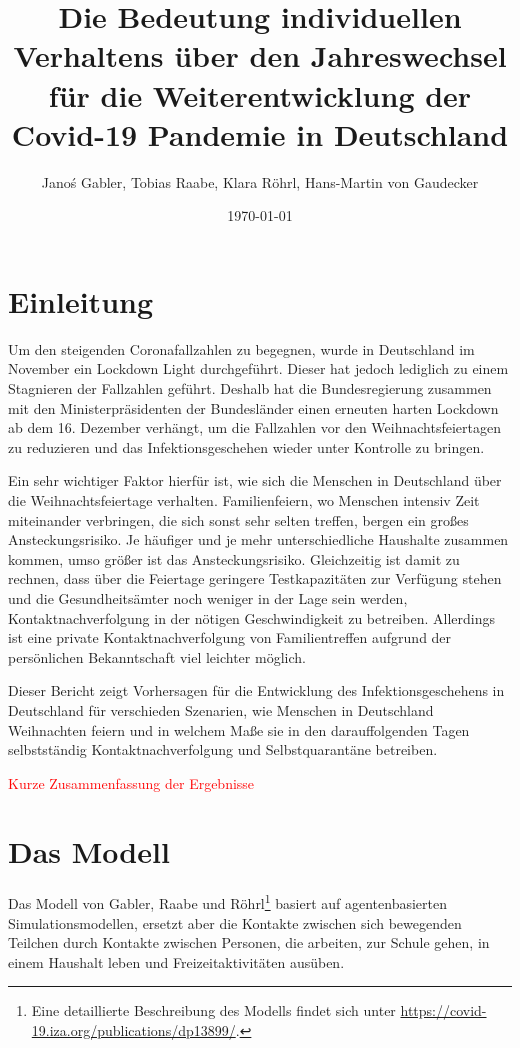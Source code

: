 \documentclass[a4paper,11pt,leqno,fleqn]{article}
\title{Die Bedeutung individuellen Verhaltens über den Jahreswechsel für die Weiterentwicklung der Covid-19 Pandemie in Deutschland}
\date{\today}
\author{Janoś Gabler, Tobias Raabe, Klara Röhrl, Hans-Martin von Gaudecker}
\begin{document}
\maketitle
{}
\setcounter{page}{1}


\section{Einleitung}

Um den steigenden Coronafallzahlen zu begegnen, wurde in Deutschland im November ein Lockdown Light durchgeführt.
Dieser hat jedoch lediglich zu einem Stagnieren der Fallzahlen geführt.
Deshalb hat die Bundesregierung zusammen mit den Ministerpräsidenten der Bundesländer einen erneuten harten Lockdown ab dem 16. Dezember verhängt, um die Fallzahlen vor den Weihnachtsfeiertagen zu reduzieren und das Infektionsgeschehen wieder unter Kontrolle zu bringen.

Ein sehr wichtiger Faktor hierfür ist, wie sich die Menschen in Deutschland über die Weihnachtsfeiertage verhalten.
Familienfeiern, wo Menschen intensiv Zeit miteinander verbringen, die sich sonst sehr selten treffen, bergen ein großes Ansteckungsrisiko.
Je häufiger und je mehr unterschiedliche Haushalte zusammen kommen, umso größer ist das Ansteckungsrisiko.
Gleichzeitig ist damit zu rechnen, dass über die Feiertage geringere Testkapazitäten zur Verfügung stehen und die Gesundheitsämter noch weniger in der Lage sein werden, Kontaktnachverfolgung in der nötigen Geschwindigkeit zu betreiben.
Allerdings ist eine private Kontaktnachverfolgung von Familientreffen aufgrund der persönlichen Bekanntschaft viel leichter möglich.

Dieser Bericht zeigt Vorhersagen für die Entwicklung des Infektionsgeschehens in Deutschland für verschieden Szenarien, wie Menschen in Deutschland Weihnachten feiern und in welchem Maße sie in den darauffolgenden Tagen selbstständig Kontaktnachverfolgung und Selbstquarantäne betreiben.

\textcolor{red}{Kurze Zusammenfassung der Ergebnisse}

\section{Das Modell}

Das Modell von Gabler, Raabe und Röhrl\footnote{Eine detaillierte Beschreibung des Modells findet sich unter \url{https://covid-19.iza.org/publications/dp13899/}.} basiert auf agentenbasierten Simulationsmodellen, ersetzt aber die Kontakte zwischen sich bewegenden Teilchen durch Kontakte zwischen Personen, die arbeiten, zur Schule gehen, in einem Haushalt leben und Freizeitaktivitäten ausüben.
\end{document}
